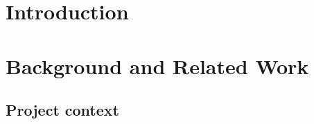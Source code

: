 \documentclass[12pt,twoside]{article}
\date{September 2018}
\begin{document}






\clearpage{\pagestyle{empty}\cleardoublepage}

\begin{abstract}
\normalsize


\end{abstract}
\cleardoublepage


\renewcommand{\abstractname}{Acknowledgements}
\begin{abstract}



\end{abstract}
\cleardoublepage


\tableofcontents 

\clearpage{\pagestyle{empty}\cleardoublepage}
\setcounter{page}{1}
\fancyhead[LE,RO]{\slshape \rightmark}
\fancyhead[LO,RE]{\slshape \leftmark}


\section{Introduction}



\clearpage



\section{Background and Related Work}
\subsection{Project context}

\end{document}
